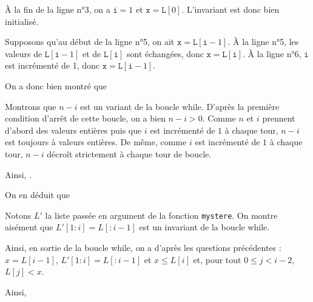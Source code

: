 \question{} À la fin de la ligne n°3, on a $\texttt i = 1$ et $\texttt x = \texttt L[0]$. L'invariant est donc bien initialisé. 

Supposons qu'au début de la ligne n°5, on ait $\texttt x = \texttt L[\texttt i-1]$. À la ligne n°5, les valeurs de $\texttt L[\texttt i-1]$ et de $\texttt L[\texttt i]$ sont échangées, donc $\texttt x = \texttt L[\texttt i]$.
À la ligne n°6, $\texttt i$ est incrémenté de 1, donc $\texttt x = \texttt L[\texttt i-1]$.

On a donc bien montré que 

\question{} Montrons que $n-i$ est un variant de la boucle while. D'après la première condition d'arrêt de cette boucle, on a bien $n-i>0$. Comme $n$ et $i$ prennent d'abord des valeurs entières puis que $i$ est incrémenté de $1$ à chaque tour, $n-i$ est toujours à valeurs entières. De même, comme $i$ est incrémenté de $1$ à chaque tour, $n-i$ décroît strictement à chaque tour de boucle. 

Ainsi, .

On en déduit que 

\question{} Notons $L'$ la liste passée en argument de la fonction \texttt{mystere}. On montre aisément que $L'[1:i] = L[:i-1]$ est un invariant de la boucle while. 

Ainsi, en sortie de la boucle while, on a d'après les questions précédentes : $x = L[i-1]$, $L'[1:i] = L[:i-1]$ et $x \leq L[i]$ et, pour tout $0 \leq j < i-2$, $L[j] < x$.

Ainsi,

\noindent{}

